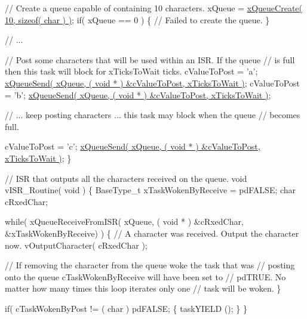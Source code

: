 \begin{DoxyPre}   // Create a queue capable of containing 10 characters.
   xQueue = \hyperlink{queue_8h_aeb858b824bd74a934ea7ebb81af2a6bb}{xQueueCreate( 10, sizeof( char ) )};
   if( xQueue == 0 )
   \{
    // Failed to create the queue.
   \}\end{DoxyPre}



\begin{DoxyPre}   // ...\end{DoxyPre}



\begin{DoxyPre}   // Post some characters that will be used within an ISR.  If the queue
   // is full then this task will block for xTicksToWait ticks.
   cValueToPost = 'a';
   \hyperlink{queue_8h_af7eb49d3249351176992950d9185abe9}{xQueueSend( xQueue, ( void * ) &cValueToPost, xTicksToWait )};
   cValueToPost = 'b';
   \hyperlink{queue_8h_af7eb49d3249351176992950d9185abe9}{xQueueSend( xQueue, ( void * ) &cValueToPost, xTicksToWait )};\end{DoxyPre}



\begin{DoxyPre}   // ... keep posting characters ... this task may block when the queue
   // becomes full.\end{DoxyPre}



\begin{DoxyPre}   cValueToPost = 'c';
   \hyperlink{queue_8h_af7eb49d3249351176992950d9185abe9}{xQueueSend( xQueue, ( void * ) &cValueToPost, xTicksToWait )};
\}\end{DoxyPre}



\begin{DoxyPre}// ISR that outputs all the characters received on the queue.
void vISR\_Routine( void )
\{
BaseType\_t xTaskWokenByReceive = pdFALSE;
char cRxedChar;\end{DoxyPre}



\begin{DoxyPre}   while( xQueueReceiveFromISR( xQueue, ( void * ) &cRxedChar, &xTaskWokenByReceive) )
   \{
    // A character was received.  Output the character now.
    vOutputCharacter( cRxedChar );\end{DoxyPre}



\begin{DoxyPre}    // If removing the character from the queue woke the task that was
    // posting onto the queue cTaskWokenByReceive will have been set to
    // pdTRUE.  No matter how many times this loop iterates only one
    // task will be woken.
   \}\end{DoxyPre}



\begin{DoxyPre}   if( cTaskWokenByPost != ( char ) pdFALSE;
   \{
    taskYIELD ();
   \}
\}
\end{DoxyPre}
 